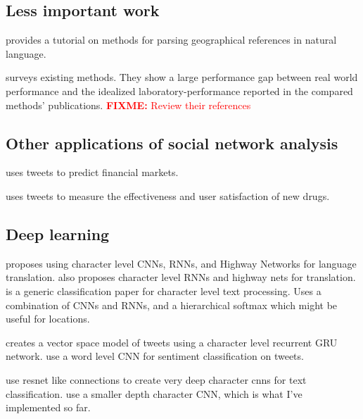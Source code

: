 \documentclass[sigconf,10pt]{acmart}
\newcommand{\fixme}[1]{\textcolor{red}{\textbf{FIXME:} {#1}}}
\begin{document}

\subsection{Less important work}

\citet{leidner2011detecting} provides a tutorial on methods for parsing geographical references in natural language.

\citet{jurgens2015geolocation} surveys existing methods.
They show a large performance gap between real world performance and the idealized laboratory-performance reported in the compared methods' publications.
\fixme{Review their references}


\subsection{Other applications of social network analysis}

\citet{ruiz2012correlating} uses tweets to predict financial markets.

\citet{wiley2014pharmaceutical} uses tweets to measure the effectiveness and user satisfaction of new drugs.


\subsection{Deep learning}

\citet{kim2016character} proposes using character level CNNs, RNNs, and Highway Networks for language translation.
\citet{chung2016character} also proposes character level RNNs and highway nets for translation.
\citet{jozefowicz2016exploring} is a generic classification paper for character level text processing.  
Uses a combination of CNNs and RNNs, and a hierarchical softmax which might be useful for locations.

\citet{dhingra2016tweet2vec} creates a vector space model of tweets using a character level recurrent GRU network.
\citet{severyn2015unitn} use a word level CNN for sentiment classification on tweets.

\citet{conneau2017very} use resnet like connections to create very deep character cnns for text classification.
\citet{zhang2015character} use a smaller depth character CNN, which is what I've implemented so far.
\end{document}
